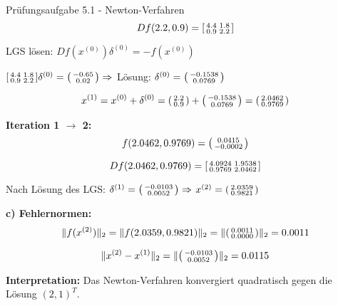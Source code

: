 \begin{example2}{Prüfungsaufgabe 5.1 - Newton-Verfahren}
$$Df(2.2, 0.9) = \begin{bsmallmatrix} 4.4 & 1.8 \\ 0.9 & 2.2 \end{bsmallmatrix}$$

LGS lösen: $Df(x^{(0)}) \delta^{(0)} = -f(x^{(0)})$

$\begin{bsmallmatrix} 4.4 & 1.8 \\ 0.9 & 2.2 \end{bsmallmatrix} \delta^{(0)} = \begin{psmallmatrix} -0.65 \\ 0.02 \end{psmallmatrix} \Rightarrow $
Lösung: $\delta^{(0)} = \begin{psmallmatrix} -0.1538 \\ 0.0769 \end{psmallmatrix}$

$$x^{(1)} = x^{(0)} + \delta^{(0)} = \begin{psmallmatrix} 2.2 \\ 0.9 \end{psmallmatrix} + \begin{psmallmatrix} -0.1538 \\ 0.0769 \end{psmallmatrix} = \begin{psmallmatrix} 2.0462 \\ 0.9769 \end{psmallmatrix}$$

\textbf{Iteration 1 $\rightarrow$ 2:}
$$f(2.0462, 0.9769) = \begin{psmallmatrix} 0.0415 \\ -0.0002 \end{psmallmatrix}$$

$$Df(2.0462, 0.9769) = \begin{bsmallmatrix} 4.0924 & 1.9538 \\ 0.9769 & 2.0462 \end{bsmallmatrix}$$

Nach Lösung des LGS: $\delta^{(1)} = \begin{psmallmatrix} -0.0103 \\ 0.0052 \end{psmallmatrix} \Rightarrow $
$x^{(2)} = \begin{psmallmatrix} 2.0359 \\ 0.9821 \end{psmallmatrix}$

\textbf{c) Fehlernormen:}
$$\|f(x^{(2)})\|_2 = \|f(2.0359, 0.9821)\|_2 = \|\begin{psmallmatrix} 0.0011 \\ 0.0000 \end{psmallmatrix}\|_2 = 0.0011$$

$$\|x^{(2)} - x^{(1)}\|_2 = \|\begin{psmallmatrix} -0.0103 \\ 0.0052 \end{psmallmatrix}\|_2 = 0.0115$$

\textbf{Interpretation:} Das Newton-Verfahren konvergiert quadratisch gegen die Lösung $(2, 1)^T$.
\end{example2}





